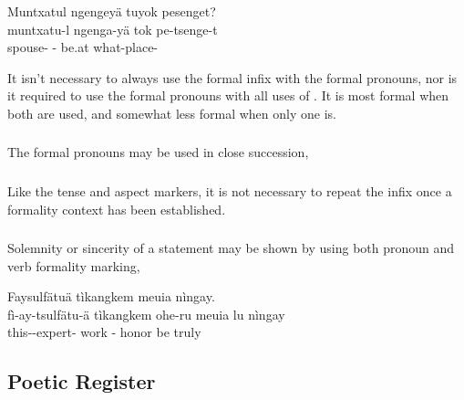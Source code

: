 \begin{interlin}
\glll Muntxatul ngengeyä tuyok pesenget? \\
   muntxatu-l ngenga-yä tok pe-tsenge-t \\
   spouse- - be.at what-place-\\
\Ipawl{}
\end{interlin}

\noindent It isn't necessary to always use the formal
infix  with the formal pronouns, nor is it required to use
the formal pronouns with all uses of .  It is most formal
when both are used, and somewhat less formal when only one is.

\subsubsection{} The formal pronouns may be used in close succession,
 

\subsubsection{} Like the tense and aspect markers, it is not
necessary to repeat the infix  once a formality context
has been established.

\subsubsection{} Solemnity or sincerity of a statement may be shown by
using both pronoun and verb formality marking,

\begin{interlin}
\glll Faysulfätuä tìkangkem  meuia  nìngay. \\
      fì-ay-tsulfätu-ä tìkangkem ohe-ru meuia lu nìngay \\
      this--expert- work - honor be truly \\
 \Ipawl{}
\end{interlin}


\subsection{Poetic Register}

